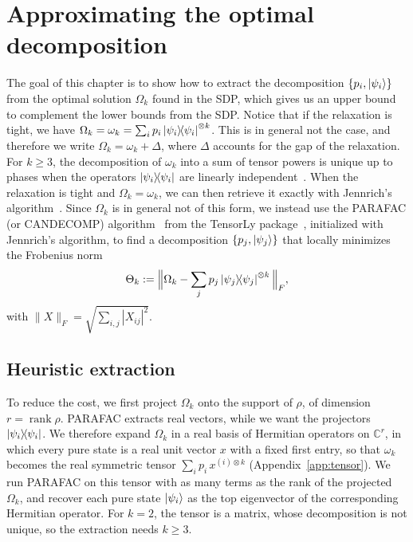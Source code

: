 \documentclass[11pt,a4paper]{report}
\newcommand{\C}{\mathds{C}}
\newcounter{reptag}
\newif\iftags \tagsfalse   %
\newcommand{\reptagbox}[3]{\iftags\par\smallskip\noindent\refstepcounter{reptag}%
  \fcolorbox{#1}{#1!7}{\parbox{\dimexpr\linewidth-2\fboxsep-2\fboxrule\relax}{\small
  \textcolor{#1}{\textbf{[\thereptag]\ #2.}}\ #3}}\par\smallskip\fi}
\newcommand{\detail}[1]{\reptagbox{tagD}{More detail}{#1}}
\begin{document}
\chapter{Approximating the optimal decomposition}\label{sec:extractingTheDecomposition}
The goal of this chapter is to show how to extract the decomposition $\{p_i, \ket{\psi_i}\}$ from the optimal solution $\Omega_k$ found in the SDP, which gives us an upper bound to complement the lower bounds from the SDP. Notice that if the relaxation is tight, we have $\Omega_k = \omega_k = \sum_i p_i \dyad{\psi_i}^{\otimes k}$. This is in general not the case, and therefore we write $\Omega_k = \omega_k + \Delta$, where $\Delta$ accounts for the gap of the relaxation.
For $k \geq 3$, the decomposition of $\omega_k$ into a sum of tensor powers is unique up to phases when the operators $\dyad{\psi_i}$ are linearly independent~\cite{Kruskal1977}. When the relaxation is tight and $\Omega_k = \omega_k$, we can then retrieve it exactly with Jennrich's algorithm~\cite{Harshman1970,Leurgans1993}. Since $\Omega_k$ is in general not of this form, we instead use the PARAFAC (or CANDECOMP) algorithm~\cite{Harshman1970,CarrollChang1970} from the TensorLy package~\cite{tensorly}, initialized with Jennrich's algorithm, to find a decomposition $\{p_j, \ket{\psi_j}\}$ that locally minimizes the Frobenius norm
\begin{equation}
    \Theta_k:=\Big\|\Omega_k - \sum_j p_j \dyad{\psi_j}^{\otimes k}\Big\|_F,
\end{equation}
with $\|X\|_F = \sqrt{\sum_{i,j} |X_{ij}|^2}$.
\detail{Tensor decompositions are new to most physics readers. In the main text, say in a few sentences why order-3 tensor decompositions are unique when matrix decompositions are not, and what Jennrich's algorithm does; put CP rank, Kruskal's condition, Jennrich step by step, alternating least squares and a two-qubit toy example in Appendix~\ref{app:extraction}.}

\section{Heuristic extraction}
To reduce the cost, we first project $\Omega_k$ onto the support of $\rho$, of dimension $r=\operatorname{rank}\rho$. PARAFAC extracts real vectors, while we want the projectors $\dyad{\psi_i}$. We therefore expand $\Omega_k$ in a real basis of Hermitian operators on $\C^r$, in which every pure state is a real unit vector $x$ with a fixed first entry, so that $\omega_k$ becomes the real symmetric tensor $\sum_ip_i\,x^{(i)\otimes k}$ (Appendix~\ref{app:tensor}). We run PARAFAC on this tensor with as many terms as the rank of the projected $\Omega_k$, and recover each pure state $\ket{\psi_i}$ as the top eigenvector of the corresponding Hermitian operator. For $k=2$, the tensor is a matrix, whose decomposition is not unique, so the extraction needs $k\geq3$.
\end{document}

